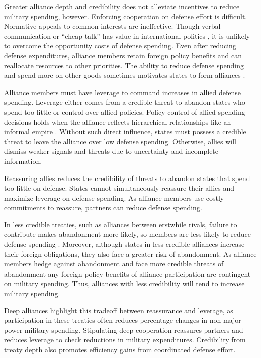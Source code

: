 \documentclass[12pt]{article}
\begin{document}
Greater alliance depth and credibility does not alleviate incentives to reduce military spending, however. 
Enforcing cooperation on defense effort is difficult.
Normative appeals to common interests are ineffective. 
Though verbal communication or ``cheap talk'' has value in international politics \citep{Trager2010}, it is unlikely to overcome the opportunity costs of defense spending. 
Even after reducing defense expenditures, alliance members retain foreign policy benefits and can reallocate resources to other priorities. 
The ability to reduce defense spending and spend more on other goods sometimes motivates states to form alliances \citep{Kimball2010, AllenDigiuseppe2013}. 


Alliance members must have leverage to command increases in allied defense spending. 
Leverage either comes from a credible threat to abandon states who spend too little or control over allied policies. 
Policy control of allied spending decisions holds when the alliance reflects hierarchical relationships like an informal empire \citep{Lake1996}. 
Without such direct influence, states must possess a credible threat to leave the alliance over low defense spending. 
Otherwise, allies will dismiss weaker signals and threats due to uncertainty and incomplete information. 


Reassuring allies reduces the credibility of threats to abandon states that spend too little on defense. 
States cannot simultaneously reassure their allies and maximize leverage on defense spending. 
As alliance members use costly commitments to reassure, partners can reduce defense spending. 


In less credible treaties, such as alliances between erstwhile rivals, failure to contribute makes abandonment more likely, so members are less likely to reduce defense spending \citep{NiouZeigler2019}. 
Moreover, although states in less credible alliances increase their foreign obligations, they also face a greater risk of abandonment. 
As alliance members hedge against abandonment and face more credible threats of abandonment any foreign policy benefits of alliance participation are contingent on military spending. 
Thus, alliances with less credibility will tend to increase military spending. 


Deep alliances highlight this tradeoff between reassurance and leverage, as participation in these treaties often reduces percentage changes in non-major power military spending. 
Stipulating deep cooperation reassures partners and reduces leverage to check reductions in military expenditures. 
Credibility from treaty depth also promotes efficiency gains from coordinated defense effort.
\end{document}
